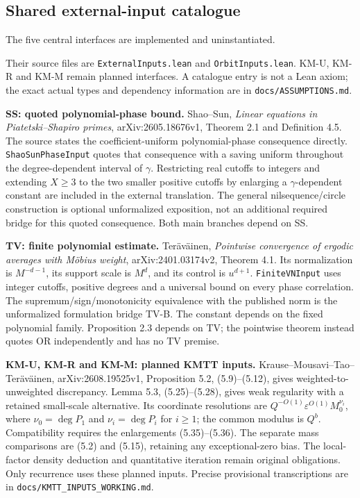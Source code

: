 \subsection*{Shared external-input catalogue}
The five central interfaces are implemented and uninstantiated.\par
Their source files are \texttt{External\allowbreak{}Inputs.lean} and \texttt{Orbit\allowbreak{}Inputs.lean}. KM-U, KM-R and KM-M remain planned interfaces. A catalogue entry is not a Lean axiom; the exact actual types and dependency information are in \texttt{docs/ASSUMPTIONS.md}.

\ifDetailed
\textbf{SS: quoted polynomial-phase bound.} Shao--Sun, \emph{Linear equations in Piatetski--Shapiro primes}, arXiv:2605.18676v1, Theorem 2.1 and Definition 4.5. The source states the coefficient-uniform polynomial-phase consequence directly. \texttt{ShaoSunPhaseInput} quotes that consequence with a saving uniform throughout the degree-dependent interval of $\gamma$. Restricting real cutoffs to integers and extending $X\geq3$ to the two smaller positive cutoffs by enlarging a $\gamma$-dependent constant are included in the external translation. The general nilsequence/circle construction is optional unformalized exposition, not an additional required bridge for this quoted consequence. Both main branches depend on SS.

\textbf{TV: finite polynomial estimate.} Ter\"av\"ainen, \emph{Pointwise convergence of ergodic averages with M\"obius weight}, arXiv:2401.03174v2, Theorem 4.1. Its normalization is $M^{-d-1}$, its support scale is $M^d$, and its control is $u^{d+1}$. \texttt{FiniteVNInput} uses integer cutoffs, positive degrees and a universal bound on every phase correlation. The supremum/sign/monotonicity equivalence with the published norm is the unformalized formulation bridge TV-B. The constant depends on the fixed polynomial family. Proposition 2.3 depends on TV; the pointwise theorem instead quotes OR independently and has no TV premise.

\textbf{KM-U, KM-R and KM-M: planned KMTT inputs.} Krause--Mousavi--Tao--Ter\"av\"ainen, arXiv:2608.19525v1, Proposition 5.2, (5.9)--(5.12), gives weighted-to-unweighted discrepancy. Lemma 5.3, (5.25)--(5.28), gives weak regularity with a retained small-scale alternative. Its coordinate resolutions are $Q^{-O(1)}\varepsilon^{O(1)}M_0^{\nu_i}$, where $\nu_0=\deg P_1$ and $\nu_i=\deg P_i$ for $i\geq1$; the common modulus is $Q^b$. Compatibility requires the enlargements (5.35)--(5.36). The separate mass comparisons are (5.2) and (5.15), retaining any exceptional-zero bias. The local-factor density deduction and quantitative iteration remain original obligations. Only recurrence uses these planned inputs. Precise provisional transcriptions are in \texttt{docs/KMTT\_INPUTS\_WORKING.md}.

